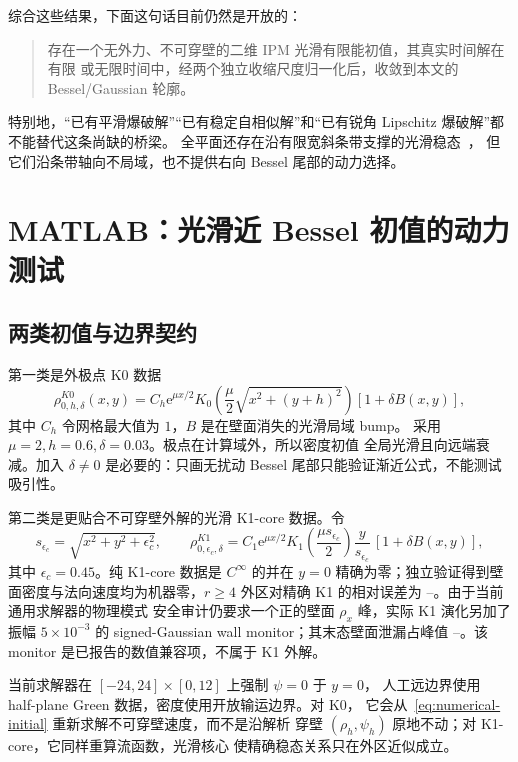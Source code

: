 \documentclass[11pt,a4paper,fontset=fandol]{ctexart}
\newcommand{\e}{\mathrm e}
\newcommand{\NumKOneWallLeakage}{--}
\newcommand{\NumKOneExteriorError}{--}
\begin{document}
综合这些结果，下面这句话目前仍然是开放的：
\begin{quote}
存在一个无外力、不可穿壁的二维 IPM 光滑有限能初值，其真实时间解在有限
或无限时间中，经两个独立收缩尺度归一化后，收敛到本文的 Bessel/Gaussian
轮廓。
\end{quote}
特别地，“已有平滑爆破解”“已有稳定自相似解”和“已有锐角 Lipschitz
爆破解”都不能替代这条尚缺的桥梁。
全平面还存在沿有限宽斜条带支撑的光滑稳态~\cite{constantinlavicol2019}，
但它们沿条带轴向不局域，也不提供右向 Bessel 尾部的动力选择。

\section{MATLAB：光滑近 Bessel 初值的动力测试}

\subsection{两类初值与边界契约}

第一类是外极点 K0 数据
\begin{equation}
  \rho^{K0}_{0,h,\delta}(x,y)
  =C_h\e^{\mu x/2}K_0\!\left(
  \frac\mu2\sqrt{x^2+(y+h)^2}\right)
  \left[1+\delta B(x,y)\right],
  \label{eq:numerical-initial}
\end{equation}
其中 $C_h$ 令网格最大值为 $1$，$B$ 是在壁面消失的光滑局域 bump。
采用 $\mu=2,h=0.6,\delta=0.03$。极点在计算域外，所以密度初值
全局光滑且向远端衰减。加入 $\delta\ne0$ 是必要的：只画无扰动 Bessel
尾部只能验证渐近公式，不能测试吸引性。

第二类是更贴合不可穿壁外解的光滑 K1-core 数据。令
\begin{equation}
  s_{\epsilon_c}=\sqrt{x^2+y^2+\epsilon_c^2},\qquad
  \rho^{K1}_{0,\epsilon_c,\delta}
  =C_1\e^{\mu x/2}K_1\!\left(\frac{\mu s_{\epsilon_c}}2\right)
  \frac{y}{s_{\epsilon_c}}\,[1+\delta B(x,y)],
  \label{eq:k1-core-initial}
\end{equation}
其中 $\epsilon_c=0.45$。纯 K1-core 数据是 $C^\infty$ 的并在 $y=0$
精确为零；独立验证得到壁面密度与法向速度均为机器零，$r\ge4$ 外区对精确
K1 的相对误差为 \NumKOneExteriorError。由于当前通用求解器的物理模式
安全审计仍要求一个正的壁面 $\rho_x$ 峰，实际 K1 演化另加了振幅
$5\times10^{-3}$ 的 signed-Gaussian wall monitor；其末态壁面泄漏占峰值
\NumKOneWallLeakage。该 monitor 是已报告的数值兼容项，不属于 K1 外解。

当前求解器在 $[-24,24]\times[0,12]$ 上强制 $\psi=0$ 于 $y=0$，
人工远边界使用 half-plane Green 数据，密度使用开放输运边界。对 K0，
它会从~\eqref{eq:numerical-initial} 重新求解不可穿壁速度，而不是沿解析
穿壁 $(\rho_h,\psi_h)$ 原地不动；对 K1-core，它同样重算流函数，光滑核心
使精确稳态关系只在外区近似成立。
\end{document}
